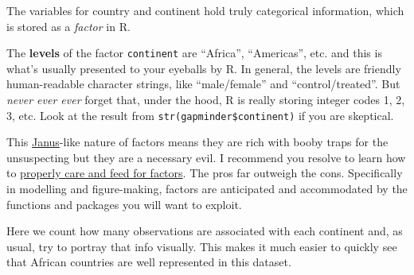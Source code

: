 \documentclass[
]{book}
\newenvironment{Shaded}{\begin{snugshade}}{\end{snugshade}}
\newcommand{\CommentTok}[1]{\textcolor[rgb]{0.56,0.35,0.01}{\textit{#1}}}
\newcommand{\KeywordTok}[1]{\textcolor[rgb]{0.13,0.29,0.53}{\textbf{#1}}}
\newcommand{\NormalTok}[1]{#1}
\newcommand{\OperatorTok}[1]{\textcolor[rgb]{0.81,0.36,0.00}{\textbf{#1}}}
\begin{document}
The variables for country and continent hold truly categorical information, which is stored as a \emph{factor} in R.

\begin{Shaded}
\end{Shaded}

The \textbf{levels} of the factor \texttt{continent} are ``Africa'', ``Americas'', etc. and this is what's usually presented to your eyeballs by R. In general, the levels are friendly human-readable character strings, like ``male/female'' and ``control/treated''. But \emph{never ever ever} forget that, under the hood, R is really storing integer codes 1, 2, 3, etc. Look at the result from \texttt{str(gapminder\$continent)} if you are skeptical.

\begin{Shaded}
\end{Shaded}

This \href{https://en.wikipedia.org/wiki/Janus}{Janus}-like nature of factors means they are rich with booby traps for the unsuspecting but they are a necessary evil. I recommend you resolve to learn how to \protect\hyperlink{factors-boss}{properly care and feed for factors}. The pros far outweigh the cons. Specifically in modelling and figure-making, factors are anticipated and accommodated by the functions and packages you will want to exploit.

Here we count how many observations are associated with each continent and, as usual, try to portray that info visually. This makes it much easier to quickly see that African countries are well represented in this dataset.
\end{document}
